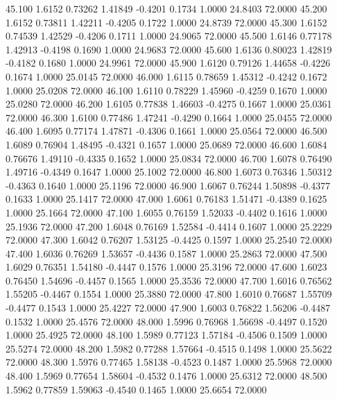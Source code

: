   45.100   1.6152   0.73262   1.41849  -0.4201   0.1734   1.0000  24.8403  72.0000
  45.200   1.6152   0.73811   1.42211  -0.4205   0.1722   1.0000  24.8739  72.0000
  45.300   1.6152   0.74539   1.42529  -0.4206   0.1711   1.0000  24.9065  72.0000
  45.500   1.6146   0.77178   1.42913  -0.4198   0.1690   1.0000  24.9683  72.0000
  45.600   1.6136   0.80023   1.42819  -0.4182   0.1680   1.0000  24.9961  72.0000
  45.900   1.6120   0.79126   1.44658  -0.4226   0.1674   1.0000  25.0145  72.0000
  46.000   1.6115   0.78659   1.45312  -0.4242   0.1672   1.0000  25.0208  72.0000
  46.100   1.6110   0.78229   1.45960  -0.4259   0.1670   1.0000  25.0280  72.0000
  46.200   1.6105   0.77838   1.46603  -0.4275   0.1667   1.0000  25.0361  72.0000
  46.300   1.6100   0.77486   1.47241  -0.4290   0.1664   1.0000  25.0455  72.0000
  46.400   1.6095   0.77174   1.47871  -0.4306   0.1661   1.0000  25.0564  72.0000
  46.500   1.6089   0.76904   1.48495  -0.4321   0.1657   1.0000  25.0689  72.0000
  46.600   1.6084   0.76676   1.49110  -0.4335   0.1652   1.0000  25.0834  72.0000
  46.700   1.6078   0.76490   1.49716  -0.4349   0.1647   1.0000  25.1002  72.0000
  46.800   1.6073   0.76346   1.50312  -0.4363   0.1640   1.0000  25.1196  72.0000
  46.900   1.6067   0.76244   1.50898  -0.4377   0.1633   1.0000  25.1417  72.0000
  47.000   1.6061   0.76183   1.51471  -0.4389   0.1625   1.0000  25.1664  72.0000
  47.100   1.6055   0.76159   1.52033  -0.4402   0.1616   1.0000  25.1936  72.0000
  47.200   1.6048   0.76169   1.52584  -0.4414   0.1607   1.0000  25.2229  72.0000
  47.300   1.6042   0.76207   1.53125  -0.4425   0.1597   1.0000  25.2540  72.0000
  47.400   1.6036   0.76269   1.53657  -0.4436   0.1587   1.0000  25.2863  72.0000
  47.500   1.6029   0.76351   1.54180  -0.4447   0.1576   1.0000  25.3196  72.0000
  47.600   1.6023   0.76450   1.54696  -0.4457   0.1565   1.0000  25.3536  72.0000
  47.700   1.6016   0.76562   1.55205  -0.4467   0.1554   1.0000  25.3880  72.0000
  47.800   1.6010   0.76687   1.55709  -0.4477   0.1543   1.0000  25.4227  72.0000
  47.900   1.6003   0.76822   1.56206  -0.4487   0.1532   1.0000  25.4576  72.0000
  48.000   1.5996   0.76968   1.56698  -0.4497   0.1520   1.0000  25.4925  72.0000
  48.100   1.5989   0.77123   1.57184  -0.4506   0.1509   1.0000  25.5274  72.0000
  48.200   1.5982   0.77288   1.57664  -0.4515   0.1498   1.0000  25.5622  72.0000
  48.300   1.5976   0.77465   1.58138  -0.4523   0.1487   1.0000  25.5968  72.0000
  48.400   1.5969   0.77654   1.58604  -0.4532   0.1476   1.0000  25.6312  72.0000
  48.500   1.5962   0.77859   1.59063  -0.4540   0.1465   1.0000  25.6654  72.0000
